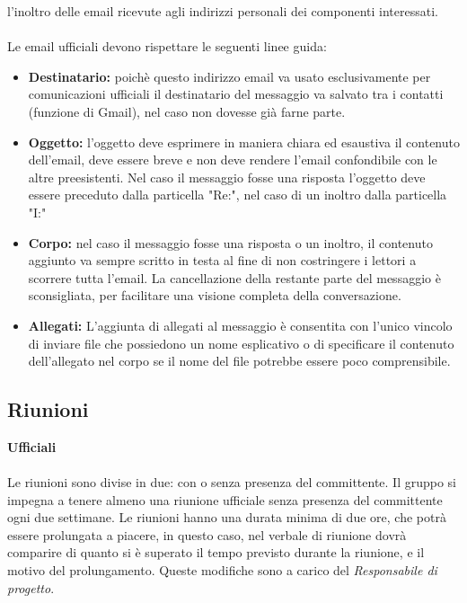 \documentclass[a4paper]{report}
\begin{document}
	l'inoltro delle email ricevute agli indirizzi personali dei componenti interessati.
	\\ \\
	Le email ufficiali devono rispettare le seguenti linee guida:
	\begin{itemize}
		\item \textbf{Destinatario:} poichè questo indirizzo email va usato esclusivamente per comunicazioni ufficiali il destinatario
		del messaggio va salvato tra i contatti (funzione di Gmail), nel caso non dovesse già farne parte.
		\item \textbf{Oggetto:} l'oggetto deve esprimere in maniera chiara ed esaustiva il contenuto dell'email, deve essere breve
		 e non deve rendere l'email confondibile con le altre preesistenti. 
		 Nel caso il messaggio fosse una risposta l'oggetto deve essere preceduto dalla particella "Re:", nel caso di un inoltro dalla
		 particella "I:"
		\item \textbf{Corpo:} nel caso il messaggio fosse una risposta o un inoltro, il contenuto aggiunto va sempre scritto in testa al
		fine di non costringere i lettori a scorrere tutta l'email. La cancellazione della restante parte del messaggio è sconsigliata, per
		facilitare una visione completa della conversazione.
		\item \textbf{Allegati:} L'aggiunta di allegati al messaggio è consentita con l'unico vincolo di inviare file che possiedono un nome
		esplicativo o di specificare il contenuto dell'allegato nel corpo se il nome del file potrebbe essere poco comprensibile.
	\end{itemize}										
	\subsection{Riunioni}
	\textbf{Ufficiali} \\ \\
		Le riunioni sono divise in due: con o senza presenza del committente. Il gruppo si impegna a tenere almeno una riunione
		ufficiale senza presenza del committente ogni due settimane. Le riunioni hanno una durata minima di due ore, che potrà 
		essere prolungata a piacere, in questo caso, nel verbale di riunione dovrà comparire di quanto si è superato il tempo
		previsto durante la riunione, e il motivo del prolungamento. Queste modifiche sono a carico del \emph{Responsabile di progetto}.
		
\end{document}

